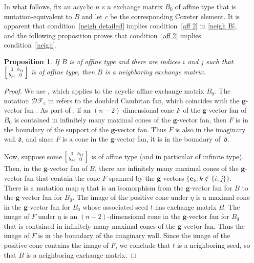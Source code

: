 \documentclass{amsart}
\newtheorem{proposition}{Proposition}[section]
\theoremstyle{definition}
\theoremstyle{remark}
\numberwithin{equation}{section}
\newcommand{\set}[1]{{\lbrace #1 \rbrace}}
\newcommand{\0}{{\mathbf{0}}}
\newcommand{\g}{\mathbf{g}}
\renewcommand{\b}{\mathbf{b}}
\newcommand{\e}{\mathbf{e}}
\renewcommand{\d}{{\mathfrak d}}
\newcommand{\DF}{{\mathcal {DF}}}
\newcommand{\sayD}[1]{\say[D]{#1}}
\begin{document}
In what follows, fix an acyclic $n\times n$ exchange matrix $B_0$ of affine type that is mutation-equivalent to $B$ and let $c$ be the corresponding Coxeter element.
It is apparent that condition~\eqref{neigh detailed} implies condition~\eqref{aff 2} in \cref{neigh B}, and the following proposition proves that condition~\eqref{aff 2} implies condition~\eqref{neigh}.
\begin{proposition}\label{aff 2 block}
If $B$ is of affine type and there are indices $i$ and $j$ such that $\begin{bsmallmatrix}0&b_{ij}\\b_{ji}&0\end{bsmallmatrix}$ is of affine type, then $B$ is a neighboring exchange matrix.
\end{proposition}

\begin{proof}
We use \cite[Corollary~4.18]{afframe}, which applies to the acyclic affine exchange matrix $B_0$.
The notation $\DF_c$ in \cite{afframe} refers to the doubled Cambrian fan, which coincides with the $\g$-vector fan \cite[Corollary~1.3]{afframe}.
As part of \cite[Corollary~4.18]{afframe}, if an $(n-2)$-dimensional cone $F$ of the $\g$-vector fan of $B_0$ is contained in infinitely many maximal cones of the $\g$-vector fan, then $F$ is in the boundary of the support of the $\g$-vector fan.
Thus $F$ is also in the imaginary wall $\d$, and since $F$ is a cone in the $\g$-vector fan, it is in the boundary of~$\d$.
  \sayD{Should these be $\d_\infty$?}

Now, suppose some $\begin{bsmallmatrix}0&b_{ij}\\b_{ji}&0\end{bsmallmatrix}$ is of affine type (and in particular of infinite type).
Then, in the $\g$-vector fan of $B$, there are infinitely many maximal cones of the $\g$-vector fan that contain the cone $F$ spanned by the $\g$-vectors $\set{\e_k:k\not\in\set{i,j}}$.
There is a mutation map $\eta$ that is an isomorphism from the $\g$-vector fan for $B$ to the $\g$-vector fan for $B_0$.
The image of the positive cone under $\eta$ is a maximal cone in the $\g$-vector fan for $B_0$ whose associated seed $t$ has exchange matrix $B$.
The image of $F$ under $\eta$ is an $(n-2)$-dimensional cone in the $\g$-vector fan for $B_0$ that is contained in infinitely many maximal cones of the $\g$-vector fan.
Thus the image of $F$ is in the boundary of the imaginary wall.
Since the image of the positive cone contains the image of $F$, we conclude that $t$ is a neighboring seed, so that $B$ is a neighboring exchange matrix.
\end{proof}
\end{document}
